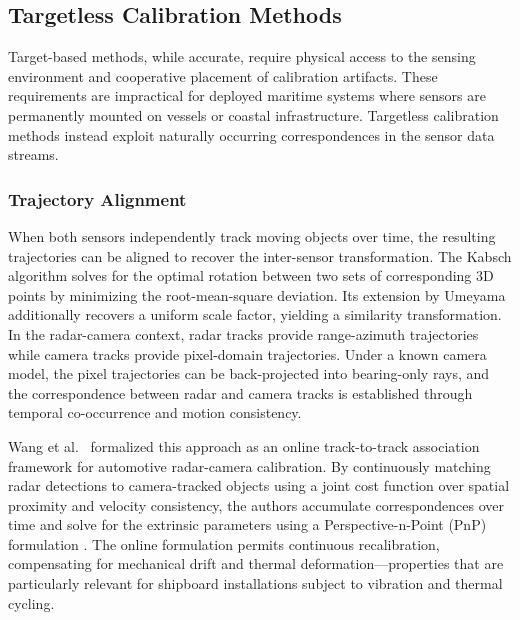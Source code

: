 \subsection{Targetless Calibration Methods}\label{sec:targetless}

Target-based methods, while accurate, require physical access to the sensing environment and cooperative placement of calibration artifacts. These requirements are impractical for deployed maritime systems where sensors are permanently mounted on vessels or coastal infrastructure. Targetless calibration methods instead exploit naturally occurring correspondences in the sensor data streams.

\subsubsection{Trajectory Alignment}

When both sensors independently track moving objects over time, the resulting trajectories can be aligned to recover the inter-sensor transformation. The Kabsch algorithm \cite{kabsch1976solution} solves for the optimal rotation between two sets of corresponding 3D points by minimizing the root-mean-square deviation. Its extension by Umeyama \cite{umeyama1991least} additionally recovers a uniform scale factor, yielding a similarity transformation. In the radar-camera context, radar tracks provide range-azimuth trajectories while camera tracks provide pixel-domain trajectories. Under a known camera model, the pixel trajectories can be back-projected into bearing-only rays, and the correspondence between radar and camera tracks is established through temporal co-occurrence and motion consistency.

Wang et al.\ \cite{wang2023online} formalized this approach as an online track-to-track association framework for automotive radar-camera calibration. By continuously matching radar detections to camera-tracked objects using a joint cost function over spatial proximity and velocity consistency, the authors accumulate correspondences over time and solve for the extrinsic parameters using a Perspective-n-Point (PnP) formulation \cite{lepetit2009epnp}. The online formulation permits continuous recalibration, compensating for mechanical drift and thermal deformation---properties that are particularly relevant for shipboard installations subject to vibration and thermal cycling.

